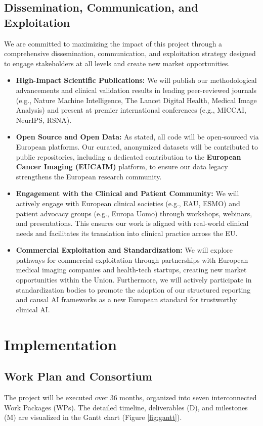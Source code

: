 \documentclass[11pt, a4paper]{article}
\begin{document}
\subsection{Dissemination, Communication, and Exploitation}
We are committed to maximizing the impact of this project through a comprehensive dissemination, communication, and exploitation strategy designed to engage stakeholders at all levels and create new market opportunities.
\begin{itemize}
    \item \textbf{High-Impact Scientific Publications:} We will publish our methodological advancements and clinical validation results in leading peer-reviewed journals (e.g., Nature Machine Intelligence, The Lancet Digital Health, Medical Image Analysis) and present at premier international conferences (e.g., MICCAI, NeurIPS, RSNA).
    \item \textbf{Open Source and Open Data:} As stated, all code will be open-sourced via European platforms. Our curated, anonymized datasets will be contributed to public repositories, including a dedicated contribution to the \textbf{European Cancer Imaging (EUCAIM)} platform, to ensure our data legacy strengthens the European research community.
    \item \textbf{Engagement with the Clinical and Patient Community:} We will actively engage with European clinical societies (e.g., EAU, ESMO) and patient advocacy groups (e.g., Europa Uomo) through workshops, webinars, and presentations. This ensures our work is aligned with real-world clinical needs and facilitates its translation into clinical practice across the EU.
    \item \textbf{Commercial Exploitation and Standardization:} We will explore pathways for commercial exploitation through partnerships with European medical imaging companies and health-tech startups, creating new market opportunities within the Union. Furthermore, we will actively participate in standardization bodies to promote the adoption of our structured reporting and causal AI frameworks as a new European standard for trustworthy clinical AI.
\end{itemize}

\section{Implementation}

\subsection{Work Plan and Consortium}
The project will be executed over 36 months, organized into seven interconnected Work Packages (WPs). The detailed timeline, deliverables (D), and milestones (M) are visualized in the Gantt chart (Figure \ref{fig:gantt}).
\end{document}
